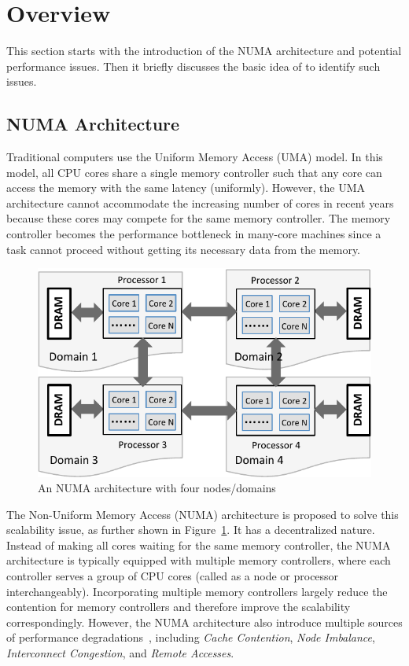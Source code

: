 \section{Overview}
\label{sec:overview}

This section starts with the introduction of the NUMA architecture and potential performance issues. Then it briefly discusses the basic idea of \NP{} to identify such issues. 

\subsection{NUMA Architecture}
\label{sec:numa}

Traditional computers use the Uniform Memory Access (UMA) model. In this model,  all CPU cores share a single memory controller such that any core can access the memory with the same latency (uniformly). However, the UMA architecture cannot accommodate the increasing number of cores in recent years because these cores may compete for the same memory controller. The memory controller becomes the performance bottleneck in many-core machines since a task cannot proceed without getting its necessary data from the memory. 

\begin{figure}[htbp]
\centering
\includegraphics[width=0.9\columnwidth]{paper/figures/Numa.pdf}
\caption{An NUMA architecture with four nodes/domains\label{fig:numa}}
\end{figure}
The Non-Uniform Memory Access (NUMA) architecture is proposed to solve this scalability issue, as further shown in Figure~\ref{fig:numa}. It has a decentralized nature. Instead of making all cores waiting for the same memory controller, the NUMA architecture  is typically equipped with multiple memory controllers, where each controller serves a group of CPU cores (called as a node or processor interchangeably). Incorporating multiple memory controllers largely reduce the contention for memory controllers and therefore improve the scalability correspondingly. However, the NUMA architecture also introduce multiple sources of performance degradations~\cite{Blagodurov:2011:CNC:2002181.2002182}, including \textit{Cache Contention}, \textit{Node Imbalance}, \textit{Interconnect Congestion}, and \textit{Remote Accesses}. 

